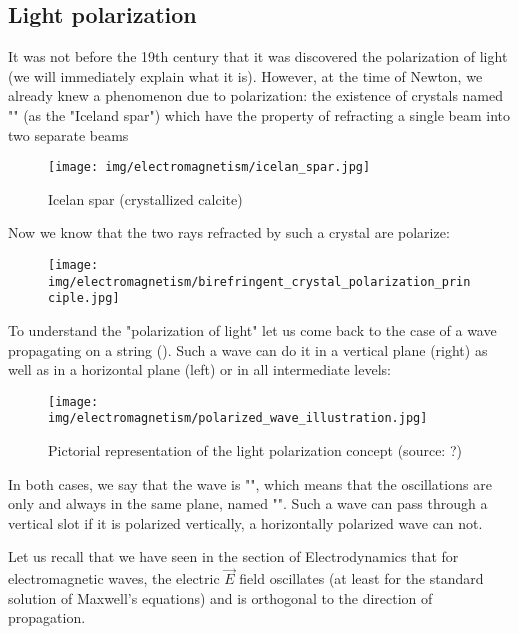 	\subsection{Light polarization}\label{light polarization}
	It was not before the 19th century that it was discovered the polarization of light (we will immediately explain what it is). However, at the time of Newton, we already knew a phenomenon due to polarization: the existence of crystals named "" (as the "Iceland spar") which have the property of refracting a single beam into two separate beams
	\begin{figure}[H]
		\centering
		\texttt{[image: img/electromagnetism/icelan\_spar.jpg]}
		\caption{Icelan spar (crystallized calcite)}
	\end{figure}
	Now we know that the two rays refracted by such a crystal are polarize:
	\begin{figure}[H]
		\centering
		\texttt{[image: img/electromagnetism/birefringent\_crystal\_polarization\_principle.jpg]}
	\end{figure}
	To understand the "polarization of light" let us come back to the case of a wave propagating on a string (). Such a wave can do it in a vertical plane (right) as well as in a horizontal plane (left) or in all intermediate levels:
	\begin{figure}[H]
		\centering
		\texttt{[image: img/electromagnetism/polarized\_wave\_illustration.jpg]}
		\caption[Pictorial representation of the light polarization concept]{Pictorial representation of the light polarization concept (source: ?)}
	\end{figure}
	In both cases, we say that the wave is "", which means that the oscillations are only and always in the same plane, named "". Such a wave can pass through a vertical slot if it is polarized vertically, a horizontally polarized wave can not.

	Let us recall that we have seen in the section of Electrodynamics that for electromagnetic waves, the electric $\vec{E}$ field oscillates (at least for the standard solution of Maxwell's equations) and is orthogonal to the direction of propagation.
	
